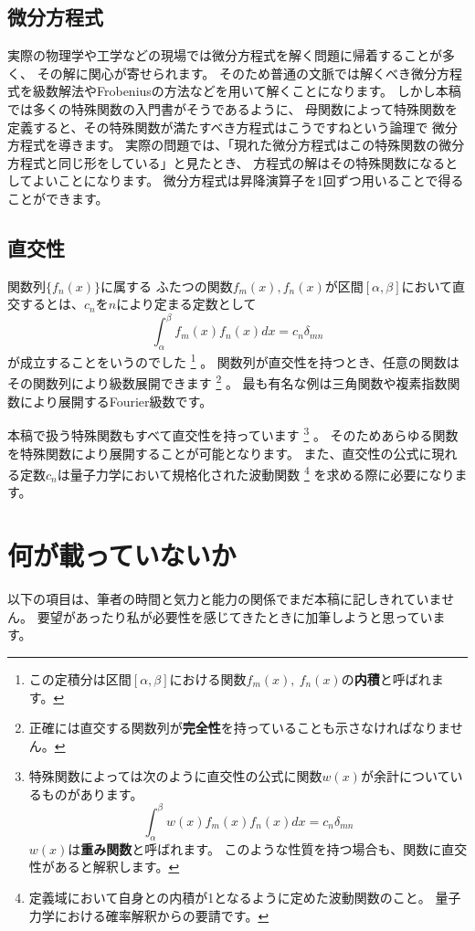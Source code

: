 \documentclass[../main/main]{subfiles}
\begin{document}
\subsection*{微分方程式}
実際の物理学や工学などの現場では微分方程式を解く問題に帰着することが多く、
その解に関心が寄せられます。
そのため普通の文脈では解くべき微分方程式を級数解法やFrobeniusの方法などを用いて解くことになります。
しかし本稿では多くの特殊関数の入門書がそうであるように、
母関数によって特殊関数を定義すると、その特殊関数が満たすべき方程式はこうですねという論理で
微分方程式を導きます。
実際の問題では、「現れた微分方程式はこの特殊関数の微分方程式と同じ形をしている」と見たとき、
方程式の解はその特殊関数になるとしてよいことになります。
微分方程式は昇降演算子を1回ずつ用いることで得ることができます。


\subsection*{直交性}
関数列$\{ f_n(x) \}$に属する
ふたつの関数$f_m(x), f_n(x)$が区間$[\alpha, \beta]$において直交するとは、$c_n$を$n$により定まる定数として
\begin{equation*}
  \int_\alpha^\beta f_m(x) f_n(x) dx = c_n \delta_{mn}
\end{equation*}
が成立することをいうのでした
\footnote{
この定積分は区間$[\alpha, \beta]$における関数$f_m(x), \ f_n(x)$の\textbf{内積}と呼ばれます。
}
。
関数列が直交性を持つとき、任意の関数はその関数列により級数展開できます
\footnote{
正確には直交する関数列が\textbf{完全性}を持っていることも示さなければなりません。
}
。
最も有名な例は三角関数や複素指数関数により展開するFourier級数です。


本稿で扱う特殊関数もすべて直交性を持っています
\footnote{
特殊関数によっては次のように直交性の公式に関数$w(x)$が余計についているものがあります。
\begin{equation*}
  \int_\alpha^\beta w(x) f_m(x) f_n(x) dx = c_n \delta_{mn}
\end{equation*}
$w(x)$は\textbf{重み関数}と呼ばれます。
このような性質を持つ場合も、関数に直交性があると解釈します。
}
。
そのためあらゆる関数を特殊関数により展開することが可能となります。
また、直交性の公式に現れる定数$c_n$は量子力学において規格化された波動関数
\footnote{
定義域において自身との内積が1となるように定めた波動関数のこと。
量子力学における確率解釈からの要請です。
}
を求める際に必要になります。




\section*{何が載っていないか}
以下の項目は、筆者の時間と気力と能力の関係でまだ本稿に記しきれていません。
要望があったり私が必要性を感じてきたときに加筆しようと思っています。
\end{document}
